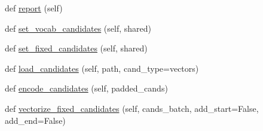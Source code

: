 \begin{DoxyCompactItemize}
\item 
def \hyperlink{classparlai_1_1core_1_1torch__ranker__agent_1_1TorchRankerAgent_a6314748dfa9aaf6e26145af686d5787d}{report} (self)
\item 
def \hyperlink{classparlai_1_1core_1_1torch__ranker__agent_1_1TorchRankerAgent_a41c604613a97e566bfcc31667d0dfc6a}{set\+\_\+vocab\+\_\+candidates} (self, shared)
\item 
def \hyperlink{classparlai_1_1core_1_1torch__ranker__agent_1_1TorchRankerAgent_a9039757596f98b45b6676b16589883a3}{set\+\_\+fixed\+\_\+candidates} (self, shared)
\item 
def \hyperlink{classparlai_1_1core_1_1torch__ranker__agent_1_1TorchRankerAgent_a353991d201d8889c453bf72c15ec78a9}{load\+\_\+candidates} (self, path, cand\+\_\+type=\textquotesingle{}vectors\textquotesingle{})
\item 
def \hyperlink{classparlai_1_1core_1_1torch__ranker__agent_1_1TorchRankerAgent_a1c8e4925f558783a51a28ccb577c42c7}{encode\+\_\+candidates} (self, padded\+\_\+cands)
\item 
def \hyperlink{classparlai_1_1core_1_1torch__ranker__agent_1_1TorchRankerAgent_af2e2d618f056bb68089c7252fa07d07b}{vectorize\+\_\+fixed\+\_\+candidates} (self, cands\+\_\+batch, add\+\_\+start=False, add\+\_\+end=False)
\end{DoxyCompactItemize}
